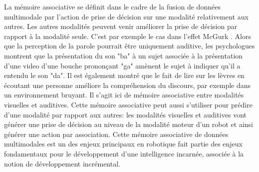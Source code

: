 \documentclass[../main]{subfiles}
\begin{document}
La mémoire associative se définit dans le cadre de la fusion de données multimodale par l'action de prise de décision sur une modalité relativement aux autres.
Les autres modalités peuvent venir améliorer la prise de décision par rapport à la modalité seule. C'est par exemple le cas dans l'effet McGurk \cite{McGurk1976HearingLA}. Alors que la perception de la parole pourrait être uniquement auditive, les psychologues montrent que la présentation du son "ba" à un sujet associée à la présentation d'une video d'une bouche prononçant "ga" amènent le sujet à indiquer qu'il a entendu le son "da". Il est également montré que le fait de lire sur les lèvres en écoutant une personne améliore la compréhension du discours, par exemple dans un environnement bruyant. Il s'agit ici de mémoire associative entre modalités visuelles et auditives.
Cette mémoire associative peut aussi s'utiliser pour prédire d'une modalité par rapport aux autres: les modalités visuelles et auditives vont générer une prise de décision au niveau de la modalité moteur d'un robot et ainsi générer une action par association.
Cette mémoire associative de données multimodales est un des enjeux principaux en robotique fait partie des enjeux fondamentaux pour le développement d'une intelligence incarnée, associée à la notion de développement incrémental.
\end{document}
